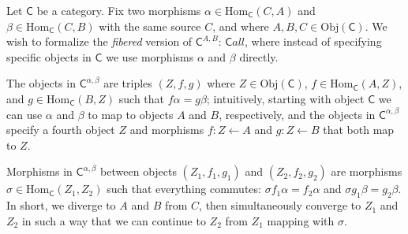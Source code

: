 \documentclass[12pt,letterpaper,boxed]{hmcpset}
\newcommand{\Obj}{\mathrm{Obj}}
\newcommand{\Hom}{\mathrm{Hom}}
\newcommand{\C}{\mathbb{C}}
\newcommand{\from}{\leftarrow}
\begin{document}
\begin{solution}
	\def \C {\mathsf{C}}
	\def \Cobj {\C^{A,B}}
	
	Let $\mathsf{C}$ be a category. Fix two morphisms $\alpha\in\Hom_\mathsf{C}(C,A)$ and
	$\beta\in\Hom_\mathsf{C}(C,B)$ with the same source $C$, and where $A,B,C\in\Obj(\mathsf{C})$.
	We wish to formalize the \textit{fibered} version of $\mathsf{C}^{A,B}$: $\mathsf{C}all$, where
	instead of specifying specific objects in $\mathsf{C}$ we use morphisms $\alpha$ and
	$\beta$ directly.
	
	The objects in $\mathsf{C}^{\alpha,\beta}$ are triples $(Z,f,g)$ where $Z\in\Obj(\mathsf{C})$,
	$f\in\Hom_{\mathsf{C}}(A,Z)$, and $g\in\Hom_{\mathsf{C}}(B,Z)$ such that $f\alpha = g\beta$;
	intuitively, starting with object $\mathsf{C}$ we can use $\alpha$ and $\beta$ to map to
	objects $A$ and $B$, respectively, and the objects in $\mathsf{C}^{\alpha,\beta}$ specify a fourth
	object $Z$ and morphisms $f:Z\from A$ and $g:Z\from B$ that both map to $Z$.
	
	Morphisms in $\mathsf{C}^{\alpha,\beta}$ between objects $(Z_1,f_1,g_1)$ and $(Z_2,f_2,g_2)$ are
	morphisms $\sigma\in\Hom_\mathsf{C}(Z_1,Z_2)$ such that everything commutes: $\sigma f_1
	\alpha = f_2 \alpha$ and $\sigma g_1 \beta = g_2 \beta$. In short, we diverge to
	$A$ and $B$ from $C$, then simultaneously converge to $Z_1$ and $Z_2$ in such a
	way that we can continue to $Z_2$ from $Z_1$ mapping with $\sigma$.
	
\end{solution}
\end{document}
